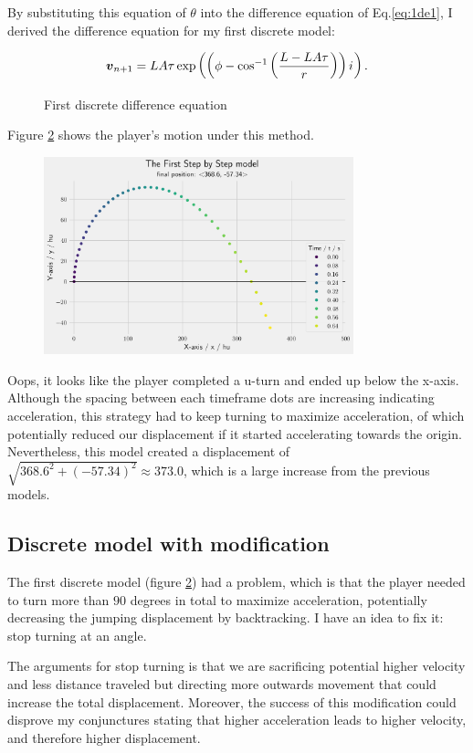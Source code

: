 By substituting this equation of $\theta$ into the difference equation of Eq.\ref{eq:1de1}, I derived the difference equation for my first discrete model:
\begin{figure}[H]
    \centering
    \[
        \boldsymbol{v}_{n+1} = LA\tau \exp\left(\left(\phi - \cos^{-1}\left(\frac{L-LA\tau}{r}\right)\right) {i\mkern1mu}\right).
    \]
    \caption{First discrete difference equation}
    \label{fig:sbs}
\end{figure}

Figure \ref{fig:1sbs} shows the player's motion under this method.

\begin{figure}[H]
    \centering
    \includegraphics[width=0.8\textwidth]{assets/step_by_step_1.png}
    \caption{}
    \label{fig:1sbs}
\end{figure}

Oops, it looks like the player completed a u-turn and ended up below the x-axis. Although the spacing between each timeframe dots are increasing indicating acceleration, this strategy had to keep turning to maximize acceleration, of which potentially reduced our displacement if it started accelerating towards the origin. Nevertheless, this model created a displacement of $\sqrt{368.6^2 + (-57.34)^2} \approx 373.0$, which is a large increase from the previous models.

\subsection{Discrete model with modification}
The first discrete model (figure \ref{fig:1sbs}) had a problem, which is that the player needed to turn more than $90$ degrees in total to maximize acceleration, potentially decreasing the jumping displacement by backtracking. I have an idea to fix it: stop turning at an angle.

The arguments for stop turning is that we are sacrificing potential higher velocity and less distance traveled but directing more outwards movement that could increase the total displacement. Moreover, the success of this modification could disprove my conjunctures stating that higher acceleration leads to higher velocity, and therefore higher displacement.

